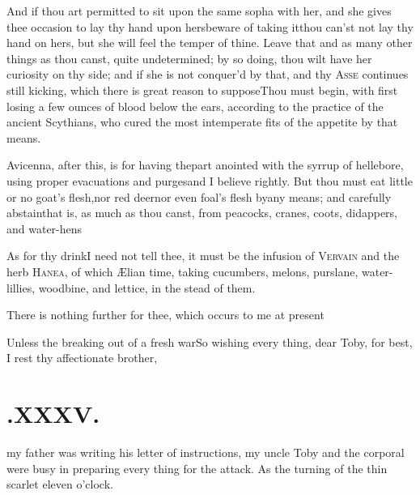 \documentclass{article}
\begin{document}
And if thou art permitted to sit upon the same sopha with her,
and she gives thee occasion to lay thy hand upon hers\tsk beware
of taking it\tsh thou can’st not lay thy hand on hers, but she
will feel the temper of thine. Leave that and as many other
things as thou canst, quite undetermined; by so doing, thou wilt
have her curiosity on thy side; and if she is not conquer’d by
that, and thy \textsc{Asse} continues still kicking, which
there is great reason to suppose\tsh Thou must begin, with first
losing a few ounces of blood below the ears, according to the
practice of the ancient Scythians, who cured the most
intemperate fits of the appetite by that means.

Avicenna, after this, is for having the\break part anointed
with the syrrup of helle\-bore, using proper evacuations and
purges\tsh and I believe rightly. But thou must eat little
or no goat’s flesh,\break nor red deer\tsh nor even
foal’s flesh by\break any means; and carefully
abstain\tsh that is, as much as thou canst, from peacocks,
cranes, coots, didappers, and water-hens\tsh

As for thy drink\tsk I need not tell thee, it must be the
infusion of \textsc{Vervain} and the herb
\textsc{Hanea}, of which Ælian
time, taking cucumbers, melons, purs\-lane, water-lillies, woodbine, and lettice,
in the stead of them.

There is nothing further for thee, which occurs to me at
present\tsh

\tsh Unless the breaking out of a fresh
war\tsh So wishing every thing, dear Toby, for
best,\\[3pt]
\indent I rest thy affectionate brother,\\[3pt]

\section{.\enspace XXXV.}

 my father was writing\break
his letter of instructions, my\break
uncle Toby and the corporal were busy\break
in preparing every thing for the attack.\break
As the turning of the thin scarlet 
eleven o’clock.
\end{document}
